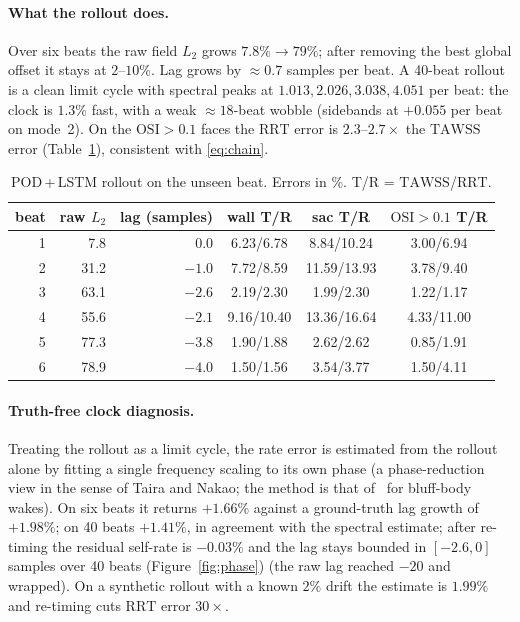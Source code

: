 \documentclass[11pt,a4paper]{article}
\newcommand{\TAWSS}{\mathrm{TAWSS}}
\newcommand{\OSI}{\mathrm{OSI}}
\newcommand{\RRT}{\mathrm{RRT}}
\begin{document}
\paragraph{What the rollout does.}
Over six beats the raw field $L_2$ grows $7.8\%\to79\%$; after removing the
best global offset it stays at $2$--$10\%$. Lag grows by $\approx0.7$ samples
per beat. A 40-beat rollout is a clean limit cycle with spectral peaks at
$1.013, 2.026, 3.038, 4.051$ per beat: the clock is $1.3\%$ fast, with a weak
$\approx18$-beat wobble (sidebands at $+0.055$ per beat on mode~2). On the
$\OSI>0.1$ faces the $\RRT$ error is $2.3$--$2.7\times$ the $\TAWSS$ error
(Table~\ref{tab:lstm}), consistent with \eqref{eq:chain}.

\begin{table}[t]
\centering
\caption{POD\,+\,LSTM rollout on the unseen beat. Errors in \%. T/R =
$\TAWSS$/$\RRT$.}
\label{tab:lstm}
\begin{tabular}{r r r c c c}
\toprule
beat & raw $L_2$ & lag (samples) & wall T/R & sac T/R & $\OSI>0.1$ T/R\\
\midrule
1 & 7.8 & 0.0 & 6.23/6.78 & 8.84/10.24 & 3.00/6.94\\
2 & 31.2 & $-1.0$ & 7.72/8.59 & 11.59/13.93 & 3.78/9.40\\
3 & 63.1 & $-2.6$ & 2.19/2.30 & 1.99/2.30 & 1.22/1.17\\
4 & 55.6 & $-2.1$ & 9.16/10.40 & 13.36/16.64 & 4.33/11.00\\
5 & 77.3 & $-3.8$ & 1.90/1.88 & 2.62/2.62 & 0.85/1.91\\
6 & 78.9 & $-4.0$ & 1.50/1.56 & 3.54/3.77 & 1.50/4.11\\
\bottomrule
\end{tabular}
\end{table}

\paragraph{Truth-free clock diagnosis.}
Treating the rollout as a limit cycle, the rate error is estimated from the
rollout alone by fitting a single frequency scaling to its own phase
(a phase-reduction view in the sense of Taira and Nakao; the method is that
of~\cite{samanta2026} for bluff-body wakes). On six beats it returns $+1.66\%$
against a ground-truth lag growth of $+1.98\%$; on 40 beats $+1.41\%$, in
agreement with the spectral estimate; after re-timing the residual self-rate is
$-0.03\%$ and the lag stays bounded in $[-2.6,0]$ samples over 40 beats
(Figure~\ref{fig:phase})
(the raw lag reached $-20$ and wrapped). On a synthetic rollout with a known
$2\%$ drift the estimate is $1.99\%$ and re-timing cuts $\RRT$ error
$30\times$.
\end{document}

